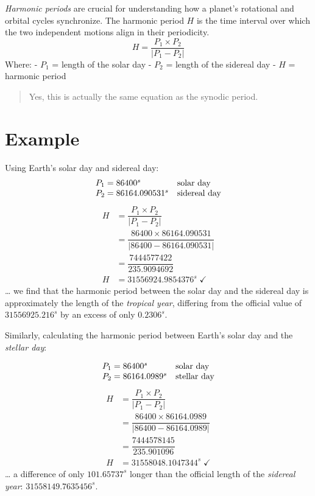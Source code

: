 \documentclass[
  letterpaper,
]{book}
\begin{document}
\emph{Harmonic periods} are crucial for understanding how a planet's
rotational and orbital cycles synchronize. The harmonic period \(H\) is
the time interval over which the two independent motions align in their
periodicity. \[
H = \dfrac{P_1 \times P_2}{|P_1 - P_2|}
\] Where: - \(P_1\) = length of the solar day - \(P_2\) = length of the
sidereal day - \(H\) = harmonic period

\begin{quote}
Yes, this is actually the same equation as the synodic period.
\end{quote}

\section{Example}\label{example-6}

Using Earth's solar day and sidereal day: \[
\begin{array}{l l}
P_1 = 86400^s &\text{solar day}\\
P_2 = 86164.090531^s &\text{sidereal day}
\end{array}
\] \[
\begin{equation}
\begin{split}
H &= \dfrac{P_1 \times P_2}{|P_1 - P_2|} \\[0.5em]
&= \dfrac{86400 \times 86164.090531}{|86400 - 86164.090531|} \\[0.5em]
&= \dfrac{7444577422}{235.9094692} \\[0.5em]
H &= 31556924.9854376^s\; \checkmark
\end{split}
\end{equation}
\] \ldots{} we find that the harmonic period between the solar day and
the sidereal day is approximately the length of the \emph{tropical
year}, differing from the official value of \(31556925.216^s\) by an
excess of only \(0.2306^s\).

Similarly, calculating the harmonic period between Earth's solar day and
the \emph{stellar day}:

\[
\begin{array}{l l}
P_1 = 86400^s &\text{solar day}\\
P_2 = 86164.0989^s &\text{stellar day}
\end{array}
\] \[
\begin{equation}
\begin{split}
H &= \dfrac{P_1 \times P_2}{|P_1 - P_2|} \\[0.5em]
&= \dfrac{86400 \times 86164.0989}{|86400 - 86164.0989|} \\[0.5em]
&= \dfrac{7444578145}{235.901096} \\[0.5em]
H &= 31558048.1047344^s\; \checkmark
\end{split}
\end{equation}
\] \ldots{} a difference of only \(101.65737^s\) longer than the
official length of the \emph{sidereal year}: \(31558149.7635456^s\).
\end{document}
